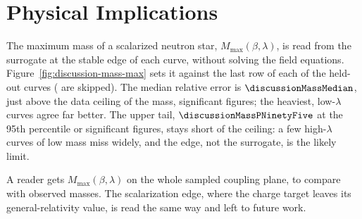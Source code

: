 \section{Physical Implications}
\label{sec:discussion}

The maximum mass of a scalarized neutron star, $M_{\max}(\beta, \lambda)$, is read from the surrogate at the stable edge of each curve, without solving the field equations. Figure~\ref{fig:discussion-mass-max} sets it against the last row of each of the \discussionMassCurves{} held-out curves (\discussionMassSkipped{} are skipped). The median relative error is $\discussionMassMedian$, just above the data ceiling of the mass, \discussionMassCeiling{} significant figures; the heaviest, low-$\lambda$ curves agree far better. The upper tail, $\discussionMassPNinetyFive$ at the 95th percentile or \discussionMassPNinetyFiveDigits{} significant figures, stays short of the ceiling: a few high-$\lambda$ curves of low mass miss widely, and the edge, not the surrogate, is the likely limit.

A reader gets $M_{\max}(\beta, \lambda)$ on the whole sampled coupling plane, to compare with observed masses. The scalarization edge, where the charge target leaves its general-relativity value, is read the same way and left to future work.

